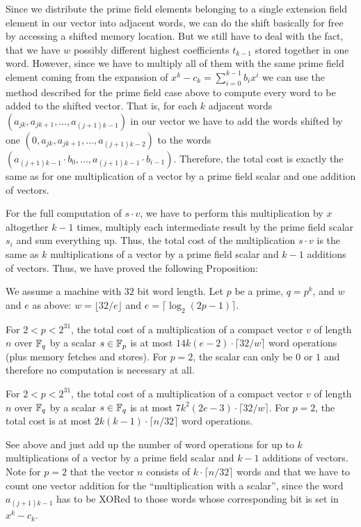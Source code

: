 Since we distribute the prime field elements belonging to a single
extension field element in our vector into adjacent words, we can 
do the shift basically for free by accessing a shifted memory location.
But we still have to deal with the fact, that we have $w$ possibly different
highest coefficients $t_{k-1}$ stored together in one word. However,
since we have to multiply all of them with the same prime field element
coming from the expansion of $x^k - c_k = \sum_{i=0}^{k-1} b_i x^i$ 
we can use the method described
for the prime field case above to compute every word to be added to the
shifted vector. That is, for each $k$ adjacent words 
$(a_{jk},a_{jk+1},\ldots,a_{(j+1)k-1})$ in our vector we have to
add the words shifted by one $(0,a_{jk},a_{jk+1},\ldots,a_{(j+1)k-2})$
to the words $(a_{(j+1)k-1} \cdot b_0, \ldots, a_{(j+1)k-1} \cdot b_{i-1})$.
Therefore, the total cost is exactly the same as for one multiplication of
a vector by a prime field scalar and one addition of vectors.

For the full computation of $s \cdot v$, we have to perform this multiplication
by $x$ altogether $k-1$ times, multiply each intermediate result by the
prime field scalar $s_i$ and sum everything up. Thus, the total cost
of the multiplication $s \cdot v$ is the same as $k$ multiplications
of a vector by a prime field scalar and $k-1$ additions of vectors.
Thus, we have proved the following Proposition:

\begin{Prop}
\label{multvec}
We assume a machine with $32$ bit word length.
Let $p$ be a prime, $q = p^k$, and $w$ and $e$ as above:
$w = \lfloor 32/e \rfloor$ and $e = \lceil \log_2(2p-1) \rceil$.

For $2 < p < 2^{31}$, the total cost of a multiplication of a compact 
vector $v$ of length $n$ over $\mathbb{F}_q$ by a scalar $s \in \mathbb{F}_p$ is at most 
$14k(e-2)\cdot \lceil 32/w \rceil$ word operations (plus memory fetches
and stores). For $p=2$, the scalar
can only be $0$ or $1$ and therefore no computation is necessary at all.

For $2 < p < 2^{31}$, the total cost of a multiplication of a compact
vector $v$ of length $n$ over $\mathbb{F}_q$ by a scalar $s \in \mathbb{F}_q$ is at most
$7k^2(2e-3)\cdot \lceil 32/w \rceil$. For $p = 2$, the total cost is
at most $2k(k-1) \cdot \lceil n/32 \rceil$ word operations.
\end{Prop}

\Proof See above and just add up the number of word operations for up
to $k$ multiplications of a vector by a prime field scalar and $k-1$
additions of vectors. Note for $p=2$ that the vector $n$ consists of
$k \cdot \lceil n/32 \rceil$ words and that we have to count one
vector addition for the ``multiplication with a scalar'', since 
the word $a_{(j+1)k-1}$ has to be XORed to those words whose corresponding
bit is set in $x^k - c_k$.
\ProofEnd

